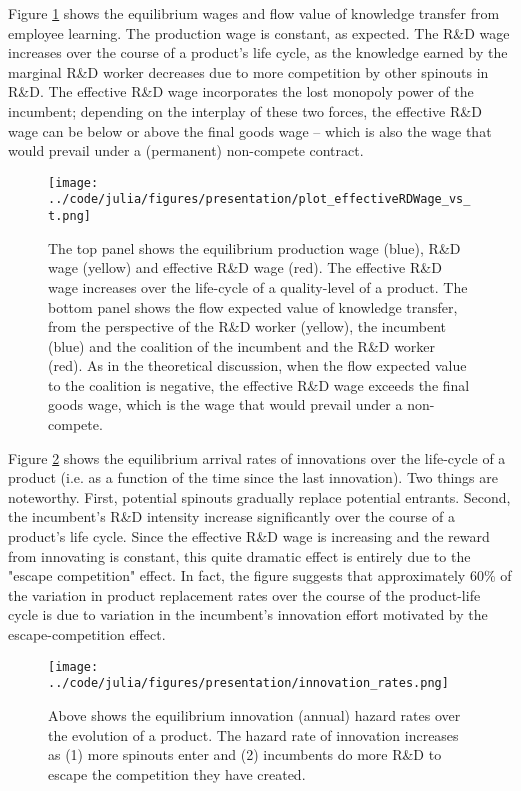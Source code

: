 \documentclass[12pt,english]{article}
\theoremstyle{remark}
\begin{document}
Figure \ref{RD_wages} shows the equilibrium wages and flow value of knowledge transfer from employee learning. The production wage is constant, as expected. The R\&D wage increases over the course of a product's life cycle, as the knowledge earned by the marginal R\&D worker decreases due to more competition by other spinouts in R\&D. The effective R\&D wage incorporates the lost monopoly power of the incumbent; depending on the interplay of these two forces, the effective R\&D wage can be below or above the final goods wage -- which is also the wage that would prevail under a (permanent) non-compete contract.

\begin{figure}[h]  
	\centering
	\texttt{[image: ../code/julia/figures/presentation/plot\_effectiveRDWage\_vs\_t.png]}
	\caption{The top panel shows the equilibrium production wage (blue), R\&D wage (yellow) and effective R\&D wage (red). The effective R\&D wage increases over the life-cycle of a quality-level of a product. The bottom panel shows the flow expected value of knowledge transfer, from the perspective of the R\&D worker (yellow), the incumbent (blue) and the coalition of the incumbent and the R\&D worker (red). As in the theoretical discussion, when the flow expected value to the coalition is negative, the effective R\&D wage exceeds the final goods wage, which is the wage that would prevail under a non-compete.}
	\label{RD_wages}
\end{figure}


Figure \ref{innovation_rates} shows the equilibrium arrival rates of innovations over the life-cycle of a product (i.e. as a function of the time since the last innovation). Two things are noteworthy. First, potential spinouts gradually replace potential entrants. Second, the incumbent's R\&D intensity increase significantly over the course of a product's life cycle. Since the effective R\&D wage is increasing and the reward from innovating is constant, this quite dramatic effect is entirely due to the "escape competition" effect. In fact, the figure suggests that approximately 60\% of the variation in product replacement rates over the course of the product-life cycle is due to variation in the incumbent's innovation effort motivated by the escape-competition effect.

\begin{figure}[h] 
	\centering
	\texttt{[image: ../code/julia/figures/presentation/innovation\_rates.png]}
	\caption{Above shows the equilibrium innovation (annual) hazard rates over the evolution of a product. The hazard rate of innovation increases as (1) more spinouts enter and (2) incumbents do more R\&D to escape the competition they have created.}
	\label{innovation_rates}
\end{figure}
\end{document}
